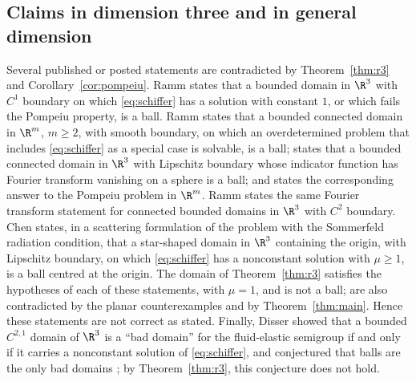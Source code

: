 \subsection{Claims in dimension three and in general dimension} Several published or posted statements are contradicted by Theorem~\ref{thm:r3} and Corollary~\ref{cor:pompeiu}. Ramm \cite[Theorems~1 and~2]{Ram17} states that a bounded domain in $\R^3$ with $C^1$ boundary on which \eqref{eq:schiffer} has a solution with constant $1$, or which fails the Pompeiu property, is a ball. Ramm \cite[Theorem~1]{Ram21} states that a bounded connected domain in $\R^m$, $m\geq2$, with smooth boundary, on which an overdetermined problem that includes \eqref{eq:schiffer} as a special case is solvable, is a ball; \cite[Theorem~A(a)]{Ram21} states that a bounded connected domain in $\R^3$ with Lipschitz boundary whose indicator function has Fourier transform vanishing on a sphere is a ball; and \cite[Theorem~C]{Ram21} states the corresponding answer to the Pompeiu problem in $\R^m$. Ramm \cite[Theorem~B]{Ram19} states the same Fourier transform statement for connected bounded domains in $\R^3$ with $C^2$ boundary. Chen \cite[Theorem~1.1]{Che16} states, in a scattering formulation of the problem with the Sommerfeld radiation condition, that a star-shaped domain in $\R^3$ containing the origin, with Lipschitz boundary, on which \eqref{eq:schiffer} has a nonconstant solution with $\mu\geq1$, is a ball centred at the origin. The domain of Theorem~\ref{thm:r3} satisfies the hypotheses of each of these statements, with $\mu=1$, and is not a ball; \cite[Theorems~1 and~C]{Ram21} are also contradicted by the planar counterexamples \cite{CS26,CLdDP26} and by Theorem~\ref{thm:main}. Hence these statements are not correct as stated. Finally, Disser \cite[Theorem~11]{Dis25} showed that a bounded $C^{2,1}$ domain of $\R^3$ is a ``bad domain'' for the fluid-elastic semigroup if and only if it carries a nonconstant solution of \eqref{eq:schiffer}, and conjectured that balls are the only bad domains \cite[Conjecture~6]{Dis25}; by Theorem~\ref{thm:r3}, this conjecture does not hold.

